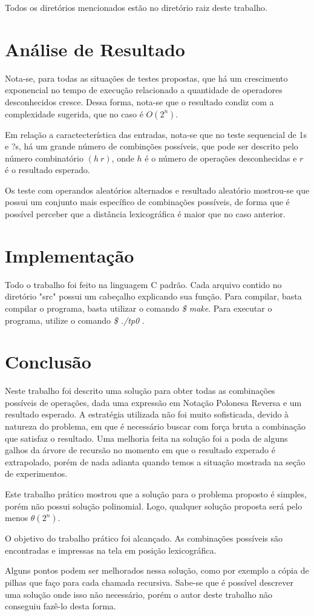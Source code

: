 \documentclass[
12pt,
a4paper,
twoside,
brazil
]{article}
\begin{document}
	Todos os diretórios mencionados estão no diretório raiz deste trabalho.
		
	\section{Análise de Resultado}
	
	Nota-se, para todas as situações de testes propostas, que há um crescimento exponencial no tempo de execução relacionado a quantidade de operadores desconhecidos cresce. Dessa forma, nota-se que o resultado condiz com a complexidade sugerida, que no caso é $O(2^n)$.
	
	Em relação a caractecterística das entradas, nota-se que no teste sequencial de 1s e ?s, há um grande número de combinções possíveis, que pode ser descrito pelo número combinatório $(h\ r)$, onde $h$ é o número de operações desconhecidas e $r$ é o resultado esperado.
	
	Os teste com operandos aleatórios alternados e resultado aleatório mostrou-se que possui um conjunto mais específico de combinações possíveis, de forma que é possível perceber que a distância lexicográfica é maior que no caso anterior.
	
	\section{Implementação}
	
	Todo o trabalho foi feito na linguagem C padrão. Cada arquivo contido no diretório "src" possui um cabeçalho explicando sua função.
	Para compilar, basta compilar o programa, basta utilizar o comando \textit{\$ make}.
	Para executar o programa, utilize o comando \textit{\$ ./tp0} .
	
	\section{Conclusão}
	
	Neste trabalho foi descrito uma solução para obter todas as combinações possíveis de operações, dada uma expressão em Notação Polonesa Reversa e um resultado esperado. A estratégia utilizada não foi muito sofisticada, devido à natureza do problema, em que é necessário buscar com força bruta a combinação que satisfaz o resultado. Uma melhoria feita na solução foi a poda de alguns galhos da árvore de recursão no momento em que o resultado experado é extrapolado, porém de nada adianta quando temos a situação mostrada na seção de experimentos.
	
	Este trabalho prático mostrou que a solução para o problema proposto é simples, porém não possui solução polinomial. Logo, qualquer solução proposta será pelo menos $\theta(2^n)$.
	
	O objetivo do trabalho prático foi alcançado. As combinações possíveis são encontradas e impressas na tela em posição lexicográfica.
	
	Alguns pontos podem ser melhorados nessa solução, como por exemplo a cópia de pilhas que faço para cada chamada recursiva. Sabe-se que é possível descrever uma solução onde isso não necessário, porém o autor deste trabalho não conseguiu fazê-lo desta forma.
	
\end{document}
